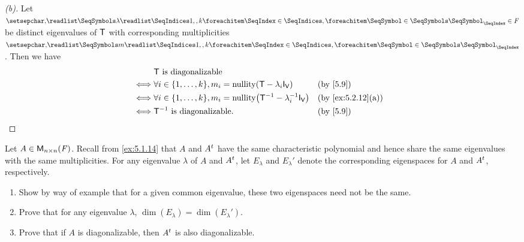 \begin{proof}[(b)]
	Let \(\seq{\lambda}{1,,k} \in \F\) be distinct eigenvalues of \(\mathsf{T}\) with corresponding multiplicities \(\seq{m}{1,,k}\).
	Then we have
	\begin{align*}
		     & \T \text{ is diagonalizable}                                                                        \\
		\iff & \forall i \in \set{1, \dots, k}, m_i = \nt{\T - \lambda_i \IT[\V]}           &  & \by{5.9}          \\
		\iff & \forall i \in \set{1, \dots, k}, m_i = \nt{\T^{-1} - \lambda_i^{-1} \IT[\V]} &  & \by{ex:5.2.12}[a] \\
		\iff & \T^{-1} \text{ is diagonalizable}.                                           &  & \by{5.9}
	\end{align*}
\end{proof}

\begin{ex}\label{ex:5.2.13}
	Let \(A \in \mathsf{M}_{{n} \times n}({\mathit{F}})\).
	Recall from \cref{ex:5.1.14} that \(A\) and \({A}^{t}\) have the same characteristic polynomial and hence share the same eigenvalues with the same multiplicities.
	For any eigenvalue \(\lambda\) of \(A\) and \({A}^{t}\), let \(E_{\lambda}\) and \(E_{\lambda}'\) denote the corresponding eigenspaces for \(A\) and \({A}^{t}\), respectively.
	\begin{enumerate}
		\item Show by way of example that for a given common eigenvalue, these two eigenspaces need not be the same.
		\item Prove that for any eigenvalue \(\lambda\), \(\dim(E_{\lambda}) = \dim(E_{\lambda}')\).
		\item Prove that if \(A\) is diagonalizable, then \({A}^{t}\) is also diagonalizable.
	\end{enumerate}
\end{ex}

